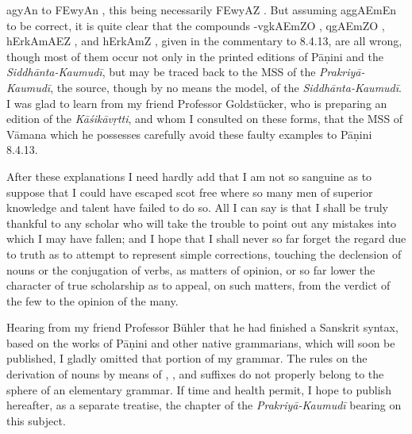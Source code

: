 {\dn ag\5yAn}  to {\dn \3FEwyAn} , this being
necessarily {\dn \3FEwyAZ} . But assuming {\dn ag\5gAEmEn}
 to be correct, it is quite clear that the compounds
{\dn -vg\0kAEmZO} , {\dn {}qgAEmZO}
, {\dn hErkAmAEZ} , and {\dn hErkAm\?Z}
, given in the commentary to 8.4.13, are all wrong,
though most of them occur not only in the printed editions of Pāṇini and
the \emph{Siddhānta-Kaumudī}, but may be traced back to the MSS of the
\emph{Prakriyā-Kaumudī}, the source, though by no means the model, of
the \emph{Siddhānta-Kaumudī}. I was glad to learn from my friend
Professor Goldstücker, who is preparing an edition of the
\emph{Kāśikāvṛtti}, and whom I consulted on these forms, that the MSS of
Vāmana which he possesses carefully avoid these faulty examples to
Pāṇini 8.4.13.

After these explanations I need hardly add that I am not so sanguine as
to suppose that I could have escaped scot free where so many men of
superior knowledge and talent have failed to do so. All I can say is
that I shall be truly thankful to any scholar who will take the trouble
to point out any mistakes into which I may have fallen; and I hope that
I shall never so far forget the regard due to truth as to attempt to
represent simple corrections, touching the declension of nouns or the
conjugation of verbs, as matters of opinion, or so far lower the
character of true scholarship as to appeal, %
on such matters, %
%
from the verdict of the few to the opinion of the many.

Hearing from my friend Professor Bühler that he had finished a Sanskrit
syntax, based on the works of Pāṇini and other native grammarians, which
will soon be published, I gladly omitted that portion of my grammar. The
rules on the derivation of nouns by means of , , and
 suffixes do not properly belong to the sphere of an
elementary grammar. If time and health permit, I hope to publish
hereafter, as a separate treatise, the chapter of the
\emph{Prakriyā-Kaumudī} bearing on this subject.

